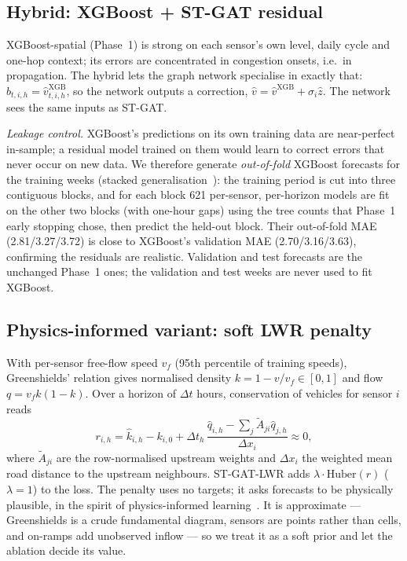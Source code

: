 \subsection{Hybrid: XGBoost + ST-GAT residual}\label{sec:hybrid}
XGBoost-spatial (Phase~1) is strong on each sensor's own level, daily cycle and one-hop context; its errors are concentrated in congestion onsets, i.e.\ in propagation. The hybrid lets the graph network specialise in exactly that: $b_{t,i,h}=\hat v^{\mathrm{XGB}}_{t,i,h}$, so the network outputs a correction, $\hat v=\hat v^{\mathrm{XGB}}+\sigma_i\hat z$. The network sees the same inputs as ST-GAT.

\emph{Leakage control.} XGBoost's predictions on its own training data are near-perfect in-sample; a residual model trained on them would learn to correct errors that never occur on new data. We therefore generate \emph{out-of-fold} XGBoost forecasts for the training weeks (stacked generalisation~\cite{wolpert1992stacked}): the training period is cut into three contiguous blocks, and for each block 621 per-sensor, per-horizon models are fit on the other two blocks (with one-hour gaps) using the tree counts that Phase~1 early stopping chose, then predict the held-out block. Their out-of-fold MAE (2.81/3.27/3.72) is close to XGBoost's validation MAE (2.70/3.16/3.63), confirming the residuals are realistic. Validation and test forecasts are the unchanged Phase~1 ones; the validation and test weeks are never used to fit XGBoost.

\subsection{Physics-informed variant: soft LWR penalty}
With per-sensor free-flow speed $v_f$ (95th percentile of training speeds), Greenshields' relation gives normalised density $k=1-v/v_f\in[0,1]$ and flow $q=v_f k(1-k)$. Over a horizon of $\Delta t$ hours, conservation of vehicles for sensor $i$ reads
\begin{equation}
r_{i,h}=\hat k_{i,h}-k_{i,0}+\Delta t_h\,\frac{\hat q_{i,h}-\textstyle\sum_{j}\tilde A_{ji}\hat q_{j,h}}{\Delta x_i}\approx 0,
\end{equation}
where $\tilde A_{ji}$ are the row-normalised upstream weights and $\Delta x_i$ the weighted mean road distance to the upstream neighbours. ST-GAT-LWR adds $\lambda\cdot\mathrm{Huber}(r)$ ($\lambda=1$) to the loss. The penalty uses no targets; it asks forecasts to be physically plausible, in the spirit of physics-informed learning~\cite{raissi2019pinn}. It is approximate --- Greenshields is a crude fundamental diagram, sensors are points rather than cells, and on-ramps add unobserved inflow --- so we treat it as a soft prior and let the ablation decide its value.

